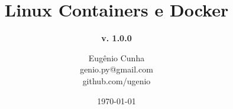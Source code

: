 
\title[] %
{ %
      \textbf{Linux Containers e Docker}
}

\subtitle[Linux Containers e Docker]
{
      \textbf{v. 1.0.0}
}

\author[Eugênio Cunha]
{      Eugênio Cunha \\
      {\ttfamily genio.py@gmail.com} \\
      {\ttfamily github.com/ugenio}
}

\institute[]
{

}

\date{\today}